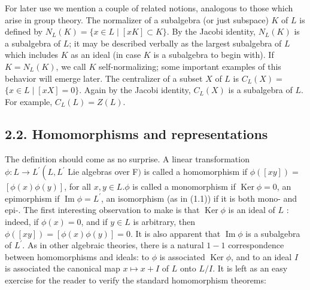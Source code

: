 \documentclass[10pt]{article}
\begin{document}
For later use we mention a couple of related notions, analogous to those which arise in group theory. The normalizer of a subalgebra (or just subspace) $K$ of $L$ is defined by $N_{L}(K)=\{x \in L \mid[x K] \subset K\}$. By the Jacobi identity, $N_{L}(K)$ is a subalgebra of $L$; it may be described verbally as the largest subalgebra of $L$ which includes $K$ as an ideal (in case $K$ is a subalgebra to begin with). If $K=N_{L}(K)$, we call $K$ self-normalizing; some important examples of this behavior will emerge later. The centralizer of a subset $X$ of $L$ is $C_{L}(X)=$ $\{x \in L \mid[x X]=0\}$. Again by the Jacobi identity, $C_{L}(X)$ is a subalgebra of $L$. For example, $C_{L}(L)=Z(L)$.

\subsection*{2.2. Homomorphisms and representations}
The definition should come as no surprise. A linear transformation $\phi: L \rightarrow L^{\prime}\left(L, L^{\prime}\right.$ Lie algebras over F$)$ is called a homomorphism if $\phi([x y])=$ $[\phi(x) \phi(y)]$, for all $x, y \in L . \phi$ is called a monomorphism if $\operatorname{Ker} \phi=0$, an epimorphism if $\operatorname{Im} \phi=L^{\prime}$, an isomorphism (as in (1.1)) if it is both mono- and epi-. The first interesting observation to make is that $\operatorname{Ker} \phi$ is an ideal of $L$ : indeed, if $\phi(x)=0$, and if $y \in L$ is arbitrary, then $\phi([x y])=[\phi(x) \phi(y)]=0$. It is also apparent that $\operatorname{Im} \phi$ is a subalgebra of $L^{\prime}$. As in other algebraic theories, there is a natural $1-1$ correspondence between homomorphisms and ideals: to $\phi$ is associated $\operatorname{Ker} \phi$, and to an ideal $I$ is associated the canonical map $x \mapsto x+I$ of $L$ onto $L / I$. It is left as an easy exercise for the reader to verify the standard homomorphism theorems:
\end{document}
